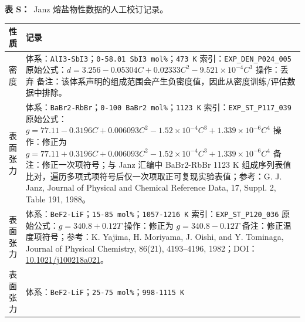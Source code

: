 \documentclass[12pt]{article}
\providecommand{\passthrough}[1]{#1}
\renewcommand{\thetable}{S\arabic{table}}
\newcommand{\sitablecaption}[1]{\Needspace{12\baselineskip}\par\noindent\stepcounter{table}\textbf{表 \thetable：}~#1\par\nobreak\smallskip}
\newcommand{\silongtablecaption}[1]{\sitablecaption{#1}\addtocounter{table}{-1}}
\begin{document}
{
\silongtablecaption{Janz 熔盐物性数据的人工校订记录。}
\footnotesize
\begin{longtable}[]{@{}
  >{\raggedright\arraybackslash}p{}
  >{\raggedright\arraybackslash}p{}@{}}
\toprule\noalign{}
性质 & 记录 \\
\midrule\noalign{}
\endhead
\bottomrule\noalign{}
\endlastfoot
密度 & 体系：\passthrough{\lstinline!AlI3-SbI3!}；\texttt{0-58.01 SbI3 mol\%}；\passthrough{\lstinline!473 K!}\newline
索引：\passthrough{\lstinline!EXP_DEN_P024_005!}\newline
原始公式：\(d = 3.256 - 0.05304 C + 0.02333 C^2 - 9.521 \times 10^{-4} C^3\)\newline
操作：丢弃\newline
备注：该体系声明的组成范围会产生负密度值，因此从密度训练/评估数据中排除。 \\
\midrule
表面张力 & 体系：\passthrough{\lstinline!BaBr2-RbBr!}；\texttt{0-100 BaBr2 mol\%}；\passthrough{\lstinline!1123 K!}\newline
索引：\passthrough{\lstinline!EXP_ST_P117_039!}\newline
原始公式：\(g = 77.11 - 0.3196 C + 0.006093 C^2 - 1.52 \times 10^{-4} C^3 + 1.339 \times 10^{-6} C^4\)\newline
操作：修正为 \(g = 77.11 + 0.3196 C + 0.006093 C^2 - 1.52 \times 10^{-4} C^3 + 1.339 \times 10^{-6} C^4\)\newline
备注：修正一次项符号；与 Janz 汇编中 BaBr2-RbBr 1123 K 组成序列表值比对，遍历多项式项符号后仅一次项取正可复现实验表值；参考：G. J. Janz, Journal of Physical and Chemical Reference Data, 17, Suppl. 2, Table 191, 1988。 \\
\midrule
表面张力 & 体系：\passthrough{\lstinline!BeF2-LiF!}；\texttt{15-85 mol\%}；\passthrough{\lstinline!1057-1216 K!}\newline
索引：\passthrough{\lstinline!EXP_ST_P120_036!}\newline
原始公式：\(g = 340.8 + 0.12 T\)\newline
操作：修正为 \(g = 340.8 - 0.12 T\)\newline
备注：修正温度项符号；参考：K. Yajima, H. Moriyama, J. Oishi, and Y. Tominaga, Journal of Physical Chemistry, 86(21), 4193--4196, 1982；DOI：\href{https://doi.org/10.1021/j100218a021}{10.1021/j100218a021}。 \\
\midrule
表面张力 & 体系：\passthrough{\lstinline!BeF2-LiF!}；\texttt{25-75 mol\%}；\passthrough{\lstinline!998-1115 K!}\newline

\end{longtable}}
\end{document}
